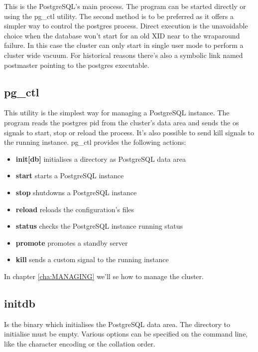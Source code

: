 \label{sec:POSTGRES}

This is the PostgreSQL's main process. The program can be started directly or
using the pg\_ctl utility. The second method is to be preferred as it offers a
simpler way to control the postgres process. Direct execution is the
unavoidable choice when the database won't start for an old XID near to the
wraparound failure. In this case the cluster can
only start in single user mode to perform a cluster wide vacuum. For historical
reasons there's also a symbolic link named postmaster pointing to the postgres
executable.

\subsection{pg\_ctl}

\label{sub:PGCTL}

This utility is the simplest way for managing a PostgreSQL instance. The
program reads the postgres pid from the cluster's data area and sends the os
signals to start, stop or reload the process. It's also possible to send kill
signals to the running instance. pg\_ctl provides the following actions:

\begin{itemize}

    \item \textbf{init[db]} initialises a directory as PostgreSQL data area
    \item \textbf{start} starts a PostgreSQL instance
    \item \textbf{stop} shutdowns a PostgreSQL instance
    \item \textbf{reload} reloads the configuration's files
    \item \textbf{status} checks the PostgreSQL instance running status
    \item \textbf{promote} promotes a standby server
    \item \textbf{kill} sends a custom signal to the running instance

\end{itemize}

In chapter \ref{cha:MANAGING} we'll se how to manage the cluster.

\subsection{initdb}

Is the binary which initialises the PostgreSQL data area. The directory to initialise must
be empty. Various options can be specified on the command line, like the character encoding or the
collation order.

